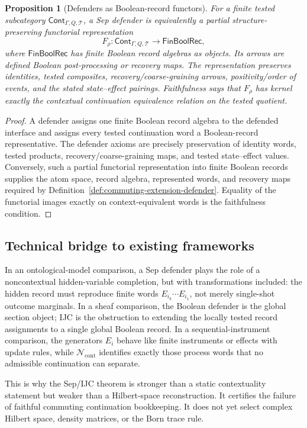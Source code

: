 \documentclass[11pt]{article}
\newtheorem{proposition}[theorem]{Proposition}
\begin{document}
\begin{proposition}[Defenders as Boolean-record functors]
\label{prop:defenders-as-boolean-functors}
For a finite tested subcategory \(\mathsf{Cont}_{\Gamma,Q,\mathcal T}\), a Sep defender is equivalently a partial structure-preserving functorial representation
\[
  F_\rho:\mathsf{Cont}_{\Gamma,Q,\mathcal T}
  \longrightarrow \mathsf{FinBoolRec},
\]
where \(\mathsf{FinBoolRec}\) has finite Boolean record algebras as objects.  Its arrows are defined Boolean post-processing or recovery maps.  The representation preserves identities, tested composites, recovery/coarse-graining arrows, positivity/order of events, and the stated state--effect pairings.  Faithfulness says that \(F_\rho\) has kernel exactly the contextual continuation equivalence relation on the tested quotient.
\end{proposition}
\begin{proof}
A defender assigns one finite Boolean record algebra to the defended interface and assigns every tested continuation word a Boolean-record representative.  The defender axioms are precisely preservation of identity words, tested products, recovery/coarse-graining maps, and tested state--effect values.  Conversely, such a partial functorial representation into finite Boolean records supplies the atom space, record algebra, represented words, and recovery maps required by Definition~\ref{def:commuting-extension-defender}.  Equality of the functorial images exactly on context-equivalent words is the faithfulness condition.
\end{proof}

\subsection*{Technical bridge to existing frameworks}
In an ontological-model comparison, a Sep defender plays the role of a noncontextual hidden-variable completion, but with transformations included: the hidden record must reproduce finite words $E_{i_k}\cdots E_{i_1}$, not merely single-shot outcome marginals.  In a sheaf comparison, the Boolean defender is the global section object; IJC is the obstruction to extending the locally tested record assignments to a single global Boolean record.  In a sequential-instrument comparison, the generators $E_i$ behave like finite instruments or effects with update rules, while $\mathcal N_{\mathrm{cont}}$ identifies exactly those process words that no admissible continuation can separate.

This is why the Sep/IJC theorem is stronger than a static contextuality statement but weaker than a Hilbert-space reconstruction.  It certifies the failure of faithful commuting continuation bookkeeping.  It does not yet select complex Hilbert space, density matrices, or the Born trace rule.
\end{document}
